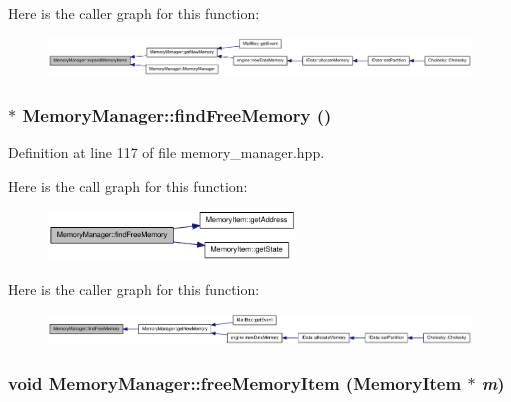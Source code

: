 Here is the caller graph for this function:\nopagebreak
\begin{figure}[H]
\begin{center}
\leavevmode
\includegraphics[width=420pt]{class_memory_manager_a672f7255418e01cccc234b563068c39e_icgraph}
\end{center}
\end{figure}
\hypertarget{class_memory_manager_abe914c7420e3ef7b101013e42b2a9602}{
\subsubsection[{findFreeMemory}]{$\ast$ MemoryManager::findFreeMemory ()}}
\label{class_memory_manager_abe914c7420e3ef7b101013e42b2a9602}


Definition at line 117 of file memory\_\-manager.hpp.

Here is the call graph for this function:\nopagebreak
\begin{figure}[H]
\begin{center}
\leavevmode
\includegraphics[width=187pt]{class_memory_manager_abe914c7420e3ef7b101013e42b2a9602_cgraph}
\end{center}
\end{figure}


Here is the caller graph for this function:\nopagebreak
\begin{figure}[H]
\begin{center}
\leavevmode
\includegraphics[width=420pt]{class_memory_manager_abe914c7420e3ef7b101013e42b2a9602_icgraph}
\end{center}
\end{figure}
\hypertarget{class_memory_manager_a68915a0f823d79218e1db6746cd8199e}{
\subsubsection[{freeMemoryItem}]{\setlength{\rightskip}{0pt plus 5cm}void MemoryManager::freeMemoryItem ({\bf MemoryItem} $\ast$ {\em m})}}
\label{class_memory_manager_a68915a0f823d79218e1db6746cd8199e}



